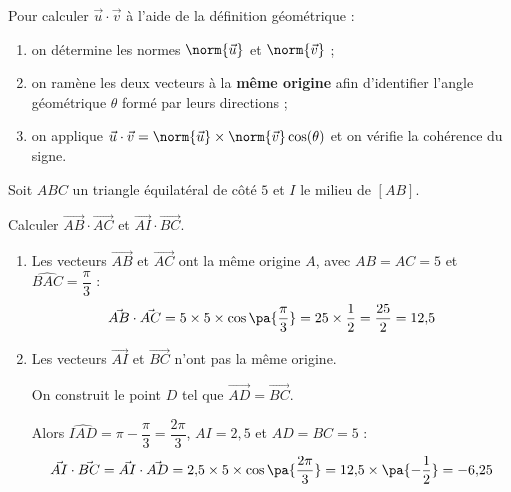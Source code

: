 \begin{methode}
	Pour calculer $\vec{u} \cdot \vec{v}$ à l'aide de la définition géométrique :
	\begin{enumerate}
		\item on détermine les normes $\norm{\vec{u}}$ et $\norm{\vec{v}}$ ;
		\item on ramène les deux vecteurs à la \textbf{même origine} afin d'identifier l'angle géométrique $\theta$ formé par leurs directions ;
		\item on applique $\vec{u} \cdot \vec{v} = \norm{\vec{u}}\times\norm{\vec{v}}\cos(\theta)$ et on vérifie la cohérence du signe.
	\end{enumerate}

	\ms
	Soit $ABC$ un triangle équilatéral de côté $5$ et $I$ le milieu de $[AB]$.

	Calculer $\vec{AB} \cdot \vec{AC}$ et $\vec{AI} \cdot \vec{BC}$.

	\begin{correction}
		\nline
		\begin{enumerate}
			\item Les vecteurs $\vec{AB}$ et $\vec{AC}$ ont la même origine $A$, avec $AB = AC = 5$ et $\widehat{BAC} = \dfrac{\pi}{3}$ :
			      \[
				      \vec{AB} \cdot \vec{AC} = 5 \times 5 \times \cos\pa{\dfrac{\pi}{3}} = 25 \times \dfrac{1}{2} = \dfrac{25}{2} = 12{,}5
			      \]
			\item Les vecteurs $\vec{AI}$ et $\vec{BC}$ n'ont pas la même origine.

			      On construit le point $D$ tel que $\vec{AD} = \vec{BC}$.

			      Alors $\widehat{IAD} = \pi - \dfrac{\pi}{3} = \dfrac{2\pi}{3}$, $AI = 2{,}5$ et $AD = BC = 5$ :
			      \[
				      \vec{AI} \cdot \vec{BC} = \vec{AI} \cdot \vec{AD} = 2{,}5 \times 5 \times \cos\pa{\dfrac{2\pi}{3}} = 12{,}5 \times \pa{-\dfrac{1}{2}} = -6{,}25
			      \]
		\end{enumerate}


\end{correction}
\end{methode}
